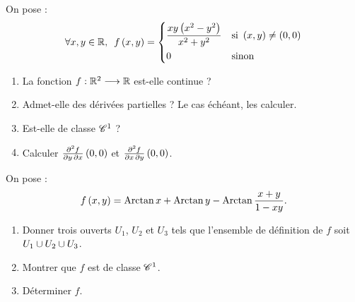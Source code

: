 \begin{corr}
\end{corr}

\begin{exo}
On pose : \[\quantifs{\forall x,y\in\R}f\paren{x,y}=\begin{dcases}
\dfrac{xy\paren{x^2-y^2}}{x^2+y^2} &\text{si }\paren{x,y}\not=\paren{0,0} \\
0 &\text{sinon}
\end{dcases}\]

\begin{enumerate}
    \item La fonction \(f:\mathbb{R}^2\longrightarrow\mathbb{R}\) est-elle continue ? \\
    \item Admet-elle des dérivées partielles ? Le cas échéant, les calculer. \\
    \item Est-elle de classe \(\mathscr{C}^{1}\) ? \\
    \item Calculer \(\pdv{f}{y,x}\left(0,0\right)\) et \(\pdv{f}{x,y}\left(0,0\right)\).
\end{enumerate}
\end{exo}

\begin{corr}
\end{corr}

\begin{exo}[Exercice 5]
On pose : \[f\left(x,y\right)=\operatorname{Arctan} x+\operatorname{Arctan} y-\operatorname{Arctan}\dfrac{x+y}{1-xy}.\]

\begin{enumerate}
    \item Donner trois ouverts  \(U_1\), \(U_2\) et \(U_3\) tels que l'ensemble de définition de \(f\) soit \(U_1\cup U_2\cup U_3\). \\
    \item Montrer que \(f\) est de classe \(\mathscr{C}^{1}\). \\
    \item Déterminer \(f\).
\end{enumerate}
\end{exo}

\begin{corr}
\end{corr}

